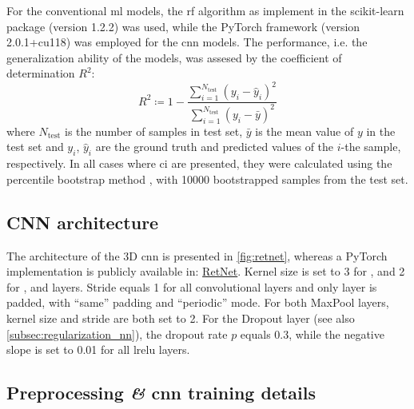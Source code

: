 For the conventional \gls{ml} models, the \gls{rf} algorithm as implement in the
scikit-learn \parencite{sklearn} package (version
1.2.2) was used, while the PyTorch \parencite{pytorch}
framework (version 2.0.1+cu118) was employed for the \gls{cnn} models. The
performance, i.e. the generalization ability of
the models, was assesed by the coefficient of determination $R^2$:
\begin{equation}
	R^2 \coloneqq 1 -
	\frac{
		\sum_{i=1}^{N_\text{test}}
		(y_i - \hat{y}_i)^2
	}{
		\sum_{i=1}^{N_\text{test}}
		(y_i - \bar{y})^2
	}
\end{equation}
where $N_\text{test}$ is the number of samples in test
set, $\bar{y}$ is the mean value of $y$ in the test set and
$y_i$, $\hat{y}_i$ are the ground truth and predicted values of the $i$-the
sample, respectively. In all cases where \gls{ci} are presented, they were
calculated using the percentile bootstrap method \parencite{Efron_1994}, with
\num{10000} bootstrapped samples from the test set.

\subsection{CNN architecture}

The architecture of the 3D \gls{cnn} is presented in \Figure{} \ref{fig:retnet},
whereas a PyTorch implementation is publicly available in:
\href{https://github.com/frudakis-research-group/retnet}{RetNet}.
Kernel size is set to \num{3} for ,  and
\num{2} for ,  and  layers. Stride equals
\num{1} for all convolutional layers and only
 layer is padded, with ``same'' padding and ``periodic''
mode. For both MaxPool layers, kernel size and stride are
both set to \num{2}. For the Dropout layer (see also \Section{}
\ref{subsec:regularization_nn}), the dropout rate $p$ equals
\num{0.3}, while the negative slope is set to \num{0.01} for all \gls{lrelu}
layers.

\subsection{Preprocessing \textit{\&} \acrshort{cnn} training details}
\label{subsec:preprocessing}

